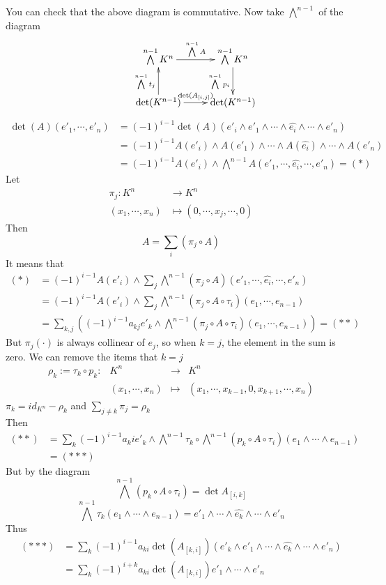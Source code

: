 \documentclass{book}
\begin{document}
You can check that the above diagram is commutative. Now take $\bigwedge\limits^{n-1}$ of the diagram
$$\xymatrix{
    &\bigwedge\limits^{n-1}K^n\ar[r]^{\bigwedge\limits^{n-1}A} &\bigwedge\limits^{n-1}K^n\ar[d]_{\bigwedge\limits^{n-1}p_i}\\
    & \det(K^{n-1})\ar[u]^{\bigwedge\limits^{n-1}t_j}\ar[r]^{\det(A_{[i,j]})} &\det(K^{n-1})
}$$
$$\begin{aligned}
    \det(A) (e'_1,\cdots,e'_n)&=(-1)^{i-1}\det(A)(e'_i\wedge e'_1\wedge\cdots\wedge \widehat{e_i}\wedge\cdots\wedge e'_n)\\
    &=(-1)^{i-1} A(e'_i)\wedge A(e'_1)\wedge\cdots\wedge A(\widehat{e_i})\wedge\cdots\wedge A(e'_n)\\
    &=(-1)^{i-1}A(e'_i)\wedge\bigwedge\limits^{n-1}A(e'_1,\cdots,\widehat{e_i},\cdots,e'_n)=(*)
\end{aligned}$$
Let $$
\begin{aligned}
    \pi_j:K^n&\rightarrow K^n\\(x_1,\cdots,x_n)&\mapsto (0,\cdots,x_j,\cdots,0)
\end{aligned}
$$
Then $$A=\sum\limits_{i}(\pi_j\circ A)$$
It means that
$$
\begin{aligned}
    (*)&=(-1)^{i-1}A(e'_i)\wedge\sum\limits_j\bigwedge\limits^{n-1}(\pi_j\circ A)(e'_1,\cdots,\widehat{e_i},\cdots,e'_n)\\
    &=(-1)^{i-1}A(e'_i)\wedge\sum\limits_j\bigwedge\limits^{n-1}(\pi_j\circ A\circ \tau_i)(e_1,\cdots,e_{n-1})\\
    &=\sum\limits_{k,j}\left((-1)^{i-1}a_{kj}e'_k\wedge\bigwedge\limits^{n-1}(\pi_j\circ A\circ \tau_i)(e_1,\cdots,e_{n-1})\right)=(**)
\end{aligned}
$$
But $\pi_j(\cdot)$ is always collinear of $e_j$, so when $k=j$, the element in the sum is zero. We can remove the items that $k=j$
$$
\begin{aligned}
    \rho_k:=\tau_k\circ p_k: &K^n &\rightarrow &K^n\\ &(x_1,\cdots,x_n)&\mapsto &(x_1,\cdots,x_{k-1},0,x_{k+1},\cdots,x_n)
\end{aligned}$$
$\pi_k=id_{K^n}-\rho_k$ and $\sum\limits_{j\neq k}\pi_j=\rho_k$\\
Then
$$\begin{aligned}
    (**)&=\sum\limits_{k}(-1)^{i-1}a_kie'_k\wedge\bigwedge\limits^{n-1}\tau_k\circ\bigwedge\limits^{n-1}(p_k\circ A\circ \tau_i)(e_1\wedge\cdots\wedge e_{n-1})\\
    &=(***)
\end{aligned}$$
But by the diagram $$\bigwedge\limits^{n-1}(p_k\circ A\circ \tau_i)=\det A_{[i,k]}$$
$$\bigwedge\limits^{n-1}\tau_k(e_1\wedge\cdots\wedge e_{n-1})=e'_1\wedge\cdots\wedge \widehat{e_k}\wedge\cdots\wedge e'_n$$
Thus
$$\begin{aligned}
    (***)&=\sum_k(-1)^{i-1}a_{ki}\det (A_{[k,i]})(e'_k\wedge e'_1\wedge\cdots\wedge \widehat{e_k}\wedge\cdots\wedge e'_n)\\
    &=\sum\limits_{k}(-1)^{i+k}a_{ki}\det(A_[k,i])e'_1\wedge\cdots\wedge e'_n
\end{aligned}$$
\end{document}
